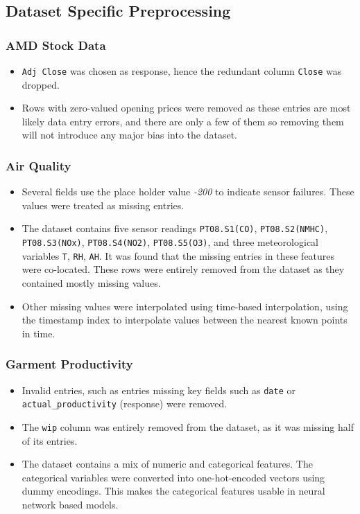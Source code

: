 \documentclass[conference]{IEEEtran}
\begin{document}
\subsection{\textbf{Dataset Specific Preprocessing}}
\subsubsection{\textbf{AMD Stock Data}}
\begin{itemize}
    \item \texttt{Adj Close} was chosen as response, hence the redundant column \texttt{Close} was dropped.
    \item Rows with zero-valued opening prices were removed as these entries are most likely data entry errors, and there are only a few of them so removing them will not introduce any major bias into the dataset.
\end{itemize}

\subsubsection{\textbf{Air Quality}}
\begin{itemize}
    \item Several fields use the place holder value \textit{-200} to indicate sensor failures. These values were treated as missing entries.
    \item The dataset contains five sensor readings \texttt{PT08.S1(CO)}, \texttt{PT08.S2(NMHC)}, \texttt{PT08.S3(NOx)}, \texttt{PT08.S4(NO2)}, \texttt{PT08.S5(O3)}, and three meteorological variables \texttt{T}, \texttt{RH}, \texttt{AH}. It was found that the missing entries in these features were co-located. These rows were entirely removed from the dataset as they contained mostly missing values.
    \item Other missing values were interpolated using time-based interpolation, using the timestamp index to interpolate values between the nearest known points in time.
\end{itemize}

\subsubsection{\textbf{Garment Productivity}}
\begin{itemize}
    \item Invalid entries, such as entries missing key fields such as \texttt{date} or \texttt{actual\_productivity} (response) were removed.
    \item The \texttt{wip} column was entirely removed from the dataset, as it was missing half of its entries.
    \item The dataset contains a mix of numeric and categorical features. The categorical variables were converted into one-hot-encoded vectors using dummy encodings. This makes the categorical features usable in neural network based models.
\end{itemize}
\end{document}
